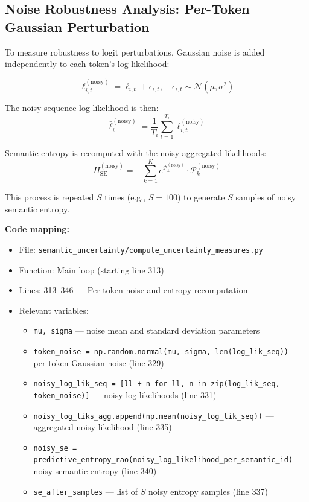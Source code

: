 \documentclass{article}
\begin{document}
\subsection{Noise Robustness Analysis: Per-Token Gaussian Perturbation}

To measure robustness to logit perturbations, Gaussian noise is added independently to each token's log-likelihood:

\begin{equation}
\ell_{i,t}^{(\text{noisy})} = \ell_{i,t} + \epsilon_{i,t}, \quad \epsilon_{i,t} \sim \mathcal{N}(\mu, \sigma^2)
\label{eq:noisy_token_logprob}
\end{equation}

The noisy sequence log-likelihood is then:
\begin{equation}
\bar{\ell}_i^{(\text{noisy})} = \frac{1}{T_i} \sum_{t=1}^{T_i} \ell_{i,t}^{(\text{noisy})}
\label{eq:noisy_seq_logprob}
\end{equation}

Semantic entropy is recomputed with the noisy aggregated likelihoods:
\begin{equation}
H_{\text{SE}}^{(\text{noisy})} = -\sum_{k=1}^{K} e^{\mathcal{P}_k^{(\text{noisy})}} \cdot \mathcal{P}_k^{(\text{noisy})}
\label{eq:noisy_semantic_entropy}
\end{equation}

This process is repeated $S$ times (e.g., $S = 100$) to generate $S$ samples of noisy semantic entropy.

\textbf{Code mapping:}
\begin{itemize}
    \item File: \texttt{semantic\_uncertainty/compute\_uncertainty\_measures.py}
    \item Function: Main loop (starting line 313)
    \item Lines: 313--346 --- Per-token noise and entropy recomputation
    \item Relevant variables:
    \begin{itemize}
        \item \texttt{mu, sigma} --- noise mean and standard deviation parameters
        \item \texttt{token\_noise = np.random.normal(mu, sigma, len(log\_lik\_seq))} --- per-token Gaussian noise (line 329)
        \item \texttt{noisy\_log\_lik\_seq = [ll + n for ll, n in zip(log\_lik\_seq, token\_noise)]} --- noisy log-likelihoods (line 331)
        \item \texttt{noisy\_log\_liks\_agg.append(np.mean(noisy\_log\_lik\_seq))} --- aggregated noisy likelihood (line 335)
        \item \texttt{noisy\_se = predictive\_entropy\_rao(noisy\_log\_likelihood\_per\_semantic\_id)} --- noisy semantic entropy (line 340)
        \item \texttt{se\_after\_samples} --- list of $S$ noisy entropy samples (line 337)
    \end{itemize}
\end{itemize}
\end{document}
